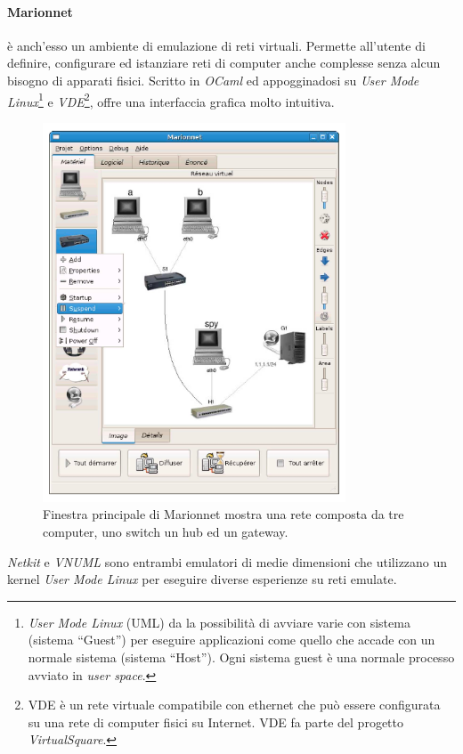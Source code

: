 \paragraph{Marionnet}\cite{MVNL08} è anch'esso un ambiente di emulazione di reti virtuali. Permette all'utente di definire, configurare ed istanziare reti di computer anche complesse senza alcun bisogno di apparati fisici. Scritto in \textit{OCaml} ed appogginadosi su \emph{User Mode Linux}\footnote{\emph{User Mode Linux} (UML) da la possibilità di avviare varie \virtualmachine{} con sistema \linux{} (sistema ``Guest'') per eseguire applicazioni come quello che accade con un normale sistema \linux{} (sistema ``Host''). Ogni sistema guest è una normale processo avviato in \emph{user space}.} e \textit{VDE}\footnote{VDE è un  rete virtuale compatibile con ethernet che può essere configurata su una rete di computer fisici su Internet. VDE fa parte del progetto \textit{VirtualSquare}.}, offre una interfaccia grafica molto intuitiva.
\begin{figure}[!ht]
	\centering
	\includegraphics[width=9cm]{images/marionnet_gui.png}
	\caption{Finestra principale di Marionnet mostra una rete composta da tre computer, uno switch un hub ed un gateway.}
	\label{figura:marionnet_gui}
\end{figure}

\textit{Netkit}\cite{NETKIT}  e \textit{VNUML}\cite{VNUMLT} sono entrambi emulatori di medie dimensioni che utilizzano un kernel \emph{User Mode Linux} per eseguire diverse esperienze su reti emulate.
